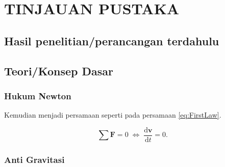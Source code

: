 \chapter{TINJAUAN PUSTAKA}

\section{Hasil penelitian/perancangan terdahulu}
\lipsum[3]

\section{Teori/Konsep Dasar}

\subsection{Hukum Newton}

Kemudian menjadi persamaan seperti pada persamaan \ref{eq:FirstLaw}.

\begin{equation}
  \label{eq:FirstLaw}
  \sum \mathbf{F} = 0\; \Leftrightarrow\; \frac{\mathrm{d} \mathbf{v} }{\mathrm{d}t} = 0.
\end{equation}

\lipsum[9]

\subsection{Anti Gravitasi}

\lipsum[10]
